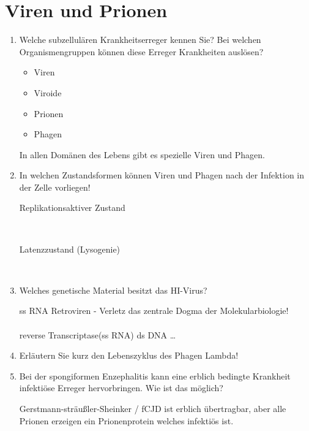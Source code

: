 \section{Viren und Prionen}
\begin{enumerate}
	\item Welche subzellulären Krankheitserreger kennen Sie? Bei welchen Organismengruppen können diese Erreger Krankheiten auslösen?
		
		\begin{itemize}
			\item Viren
			\item Viroide
			\item Prionen
			\item Phagen
		\end{itemize}
		
		In allen Domänen des Lebens gibt es spezielle Viren und Phagen.

	\item In welchen Zustandsformen können Viren und Phagen nach der Infektion in der Zelle vorliegen!

		\begin{description}
			\item[Replikationsaktiver Zustand] \hfill \\
			\item[Latenzzustand (Lysogenie)] \hfill \\
		\end{description}

	\item Welches genetische Material besitzt das HI-Virus? 
		
		ss RNA Retroviren - Verletz das zentrale Dogma der Molekularbiologie!\\
		\\
		reverse Transcriptase(ss RNA) \textrightarrow ds DNA \ldots

	\item Erläutern Sie kurz den Lebenszyklus des Phagen Lambda!
	\item Bei der spongiformen Enzephalitis kann eine erblich bedingte Krankheit infektiöse Erreger hervorbringen. Wie ist das möglich?
		
		Gerstmann-sträußler-Sheinker / fCJD ist erblich übertragbar,
		aber alle Prionen erzeigen ein Prionenprotein welches infektiös ist.

\end{enumerate}
